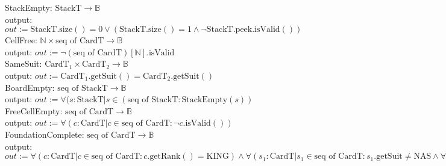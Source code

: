 \documentclass[12pt]{article}
\newcommand{\m}[1]{\mbox{#1}}
\begin{document}
\noindent StackEmpty: $\mbox{StackT} \rightarrow \mathbb{B}$\\
\noindent output: $out := \m{StackT}.\m{size}()=0 \lor (\m{StackT}.\m{size}()=1 \land \lnot \m{StackT.peek.isValid}())$\\

\noindent CellFree: $\mathbb{N} \times \mbox{seq of CardT} \rightarrow \mathbb{B}$\\
\noindent output: $out := \lnot (\mbox{seq of CardT})[\mathbb{N}].\m{isValid}$\\

\noindent SameSuit: $\mbox{CardT}_1 \times \mbox{CardT}_2 \rightarrow \mathbb{B}$\\
\noindent output: $out := \mbox{CardT}_1.\m{getSuit}()=\mbox{CardT}_2.\m{getSuit}()$\\

\noindent BoardEmpty: $\mbox{seq of StackT} \rightarrow \mathbb{B}$\\
\noindent output: $out := \forall(s : \mbox{StackT} | s \in (\mbox{seq of StackT} : \m{StackEmpty}(s))$\\

\noindent FreeCellEmpty: $\mbox{seq of CardT} \rightarrow \mathbb{B}$\\
\noindent output: $out := \forall(c : \mbox{CardT} | c \in \mbox{seq of CardT} : \lnot c.\m{isValid}())$\\

\noindent FoundationComplete: $\mbox{seq of CardT} \rightarrow \mathbb{B}$\\
\noindent output: $out := \forall(c : \mbox{CardT} | c \in \mbox{seq of CardT} : c.\m{getRank}()=\m{KING}) \land \forall(s_1 : \mbox{CardT} | s_1 \in \mbox{seq of CardT} : s_1.\m{getSuit} \neq \mbox{NAS} \land \forall(s_2 : \mbox{CardT} | s_2 \in \mbox{seq of CardT} \mbox{\textbackslash} s_1 : s_1.\m{getSuit}() \neq s_2.\m{getSuit}()))$\\

\end{document}
